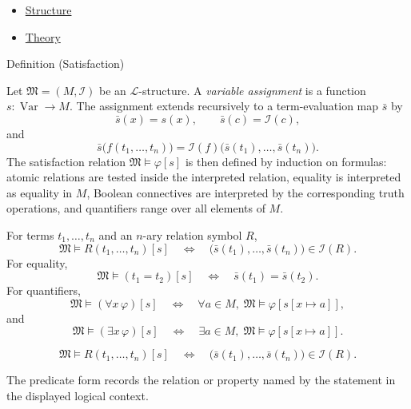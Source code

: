 \begin{dependencies}
\begin{itemize}
  \item \hyperref[def:axiom-systems-structure]{Structure}
  \item \hyperref[def:axiom-systems-theory]{Theory}
\end{itemize}
\end{dependencies}

\begin{definitionbox}{Definition (Satisfaction)}
\begin{definition}[Satisfaction]
\label{def:axiom-systems-satisfaction}
Let $\mathfrak{M}=(M,\mathcal{I})$ be an $\mathcal{L}$-structure. A
\emph{variable assignment} is a function $s:\operatorname{Var}\to M$. The
assignment extends recursively to a term-evaluation map $\bar{s}$ by
\[
  \bar{s}(x)=s(x),\qquad
  \bar{s}(c)=\mathcal{I}(c),
\]
and
\[
  \bar{s}\bigl(f(t_1,\ldots,t_n)\bigr)
  =
  \mathcal{I}(f)\bigl(\bar{s}(t_1),\ldots,\bar{s}(t_n)\bigr).
\]
The satisfaction relation $\mathfrak{M}\vDash\varphi[s]$ is then defined by
induction on formulas: atomic relations are tested inside the interpreted
relation, equality is interpreted as equality in $M$, Boolean connectives are
interpreted by the corresponding truth operations, and quantifiers range over
all elements of $M$.
\end{definition}
\end{definitionbox}
\begin{remark*}
For terms $t_1,\ldots,t_n$ and an $n$-ary relation symbol $R$,
\[
  \mathfrak{M}\vDash R(t_1,\ldots,t_n)[s]
  \quad\Longleftrightarrow\quad
  \bigl(\bar{s}(t_1),\ldots,\bar{s}(t_n)\bigr)\in\mathcal{I}(R).
\]
For equality,
\[
  \mathfrak{M}\vDash (t_1=t_2)[s]
  \quad\Longleftrightarrow\quad
  \bar{s}(t_1)=\bar{s}(t_2).
\]
For quantifiers,
\[
  \mathfrak{M}\vDash(\forall x\,\varphi)[s]
  \quad\Longleftrightarrow\quad
  \forall a\in M,\; \mathfrak{M}\vDash\varphi[s[x\mapsto a]],
\]
and
\[
  \mathfrak{M}\vDash(\exists x\,\varphi)[s]
  \quad\Longleftrightarrow\quad
  \exists a\in M,\; \mathfrak{M}\vDash\varphi[s[x\mapsto a]].
\]
\end{remark*}

\begin{remark*}
\[
\mathfrak{M}\vDash R(t_1,\ldots,t_n)[s]
  \quad\Longleftrightarrow\quad
  \bigl(\bar{s}(t_1),\ldots,\bar{s}(t_n)\bigr)\in\mathcal{I}(R).
\]

The predicate form records the relation or property named by the statement in
the displayed logical context.
\end{remark*}


